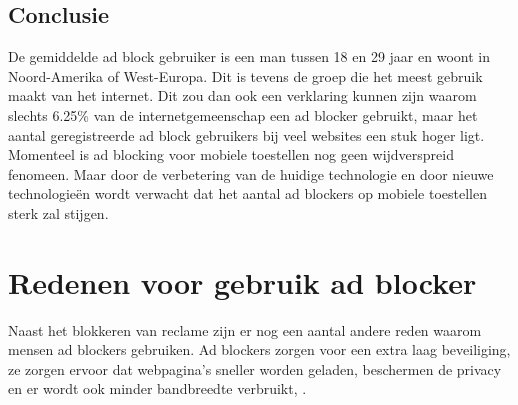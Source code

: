 \documentclass[pdftex,a4paper,12pt,twoside]{report}
\begin{document}
\subsection{Conclusie}
\label{sec Conclusie}
De gemiddelde ad block gebruiker is een man tussen 18 en 29 jaar en woont in Noord-Amerika of West-Europa. Dit is tevens de groep die het meest gebruik maakt van het internet. Dit zou dan ook een verklaring kunnen zijn waarom slechts 6.25\% van de internetgemeenschap een ad blocker gebruikt, maar het aantal geregistreerde ad block gebruikers bij veel websites een stuk hoger ligt. Momenteel is ad blocking voor mobiele toestellen nog geen wijdverspreid fenomeen. Maar door de verbetering van de huidige technologie en door nieuwe technologieën wordt verwacht dat het aantal ad blockers op mobiele toestellen sterk zal stijgen.

\section{Redenen voor gebruik ad blocker}
\label{sec:Redenen voor gebruik ad blocker}
Naast het blokkeren van reclame zijn er nog een aantal andere reden waarom mensen ad blockers gebruiken. Ad blockers zorgen voor een extra laag beveiliging, ze zorgen ervoor dat webpagina's sneller worden geladen, beschermen de privacy en er wordt ook minder bandbreedte verbruikt, \cite{IAB2014}.

\end{document}
